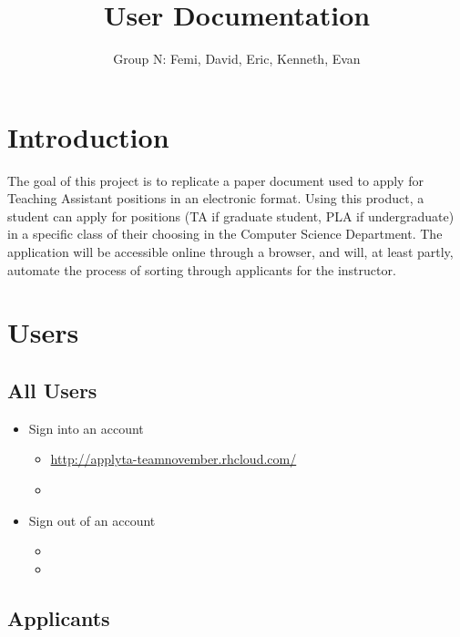 \documentclass[11pt]{amsart}
\title{User Documentation}
\author{Group N: Femi, David, Eric, Kenneth, Evan}
\begin{document}
\maketitle
\section{Introduction}
\noindent The goal of this project is to replicate a paper document used to apply for Teaching Assistant positions in an electronic format. Using this product, a student can apply for positions (TA if graduate student, PLA if undergraduate) in a specific class of their choosing in the Computer Science Department. The application will be accessible online through a browser, and will, at least partly, automate the process of sorting through applicants for the instructor.
\section{Users}


\subsection{All Users}

\begin{itemize}
	\item{Sign into an account}
	\begin{itemize}
		\item{\href{http://applyta-teamnovember.rhcloud.com/}{http://applyta-teamnovember.rhcloud.com/}}
		\item{}
	\end{itemize}
	\item{Sign out of an account}
	\begin{itemize}
		\item{}
		\item{}
	\end{itemize}
\end{itemize}

\subsection{Applicants}
\end{document}

